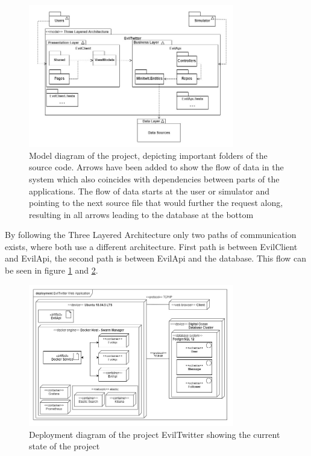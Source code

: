 \documentclass[report/main.tex]{subfiles}
\begin{document}
            \begin{figure}[H]
                \centering
                \includegraphics[width=0.8\textwidth]{report/images/EvilTwitter-Model Diagram - Evil Corp.jpg}
                \caption{Model diagram of the project, depicting important folders of the source code. Arrows have been added to show the flow of data in the system which also coincides with dependencies between parts of the applications. The flow of data starts at the user or simulator and pointing to the next source file that would further the request along, resulting in all arrows leading to the database at the bottom}
                \label{fig:model-diagram}
            \end{figure}
            
            By following the Three Layered Architecture only two paths of communication exists, where both use a different architecture. First path is between EvilClient and EvilApi, the second path is between EvilApi and the database. This flow can be seen in figure \ref{fig:model-diagram} and \ref{fig:deployment-diagram}.
            
            \begin{figure}
                \centering
                \includegraphics[width=0.8\textwidth]{report/images/EvilTwitter-Deployment Diagram - Evil Corp.jpg}
                \caption{Deployment diagram of the project EvilTwitter showing the current state of the project}
                \label{fig:deployment-diagram}
            \end{figure}
            
\end{document}
